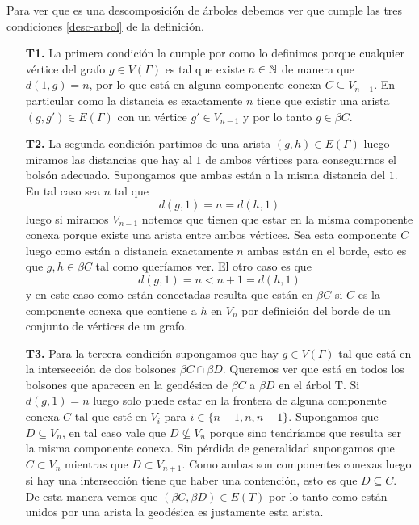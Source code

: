 \documentclass[tesis.tex]{subfiles}
\begin{document}
\begin{ej}
	Para ver que es una descomposición de árboles debemos ver que cumple las tres condiciones \ref{desc-arbol} de la definición. 
	\begin{enumerate}
		\item[\textbf{T1.}] La primera condición la cumple por como lo definimos porque cualquier vértice del grafo $g \in V(\Gamma)$ 
		es tal que existe $n \in \mathbb{N}$ de manera que $d(1,g)=n$, por lo que está en alguna componente conexa $C \subseteq V_{n-1}$. 
		En particular como la distancia es exactamente $n$ tiene que existir una arista $(g,g') \in E(\Gamma)$ con un vértice $g' \in V_{n-1}$ y por lo tanto $g \in \beta C$.
		
		\item[\textbf{T2.}] La segunda condición partimos de una arista $(g,h) \in E(\Gamma)$ luego miramos las distancias que hay al $1$ de ambos vértices para conseguirnos el bolsón adecuado. 
		Supongamos que ambas están a la misma distancia del $1$. En tal caso sea $n$ tal que 
		\[
			d(g,1)=n = d(h,1)
		\] 
		luego si miramos $V_{n-1}$ notemos que tienen que estar en la misma componente conexa porque existe una arista entre ambos vértices. Sea esta componente $C$ luego como están a distancia exactamente $n$ ambas están en el borde, esto es que $g,h \in \beta C$ tal como queríamos ver. 
		El otro caso es que 
		\[
			d(g,1)=n < n+1 = d(h,1)
		\] 
		y en este caso como están conectadas resulta que están en $\beta C$ si $C$ es la componente conexa que contiene a $h$ en $V_n$ por definición del borde de un conjunto de vértices de un grafo.
		
		\item[\textbf{T3.}] Para la tercera condición supongamos que hay $g \in V(\Gamma)$ tal que está en la intersección de dos bolsones $\beta C \cap \beta D$. 
		Queremos ver que está en todos los bolsones que aparecen en la geodésica de $\beta C$ a $\beta D$ en el árbol T. 
		Si $d(g,1) = n$ luego solo puede estar en la frontera de alguna componente conexa $C$ tal que esté en $V_{i}$ para $i\in \{n-1, n, n+1\}$. 
		Supongamos que $D \subseteq V_{n}$, en tal caso vale que $D \nsubseteq V_{n}$ porque sino tendríamos que resulta ser la misma componente conexa. 
		Sin pérdida de generalidad supongamos que $C \subset V_n$ mientras que $D \subset V_{n+1}$. 
		Como ambas son componentes conexas luego si hay una intersección tiene que haber una contención, esto es que $D \subseteq C$. 
		De esta manera vemos que $(\beta C, \beta D) \in E(T)$ por lo tanto como están unidos por una arista la geodésica es justamente esta arista.
		
	\end{enumerate}
\end{ej}
\end{document}
